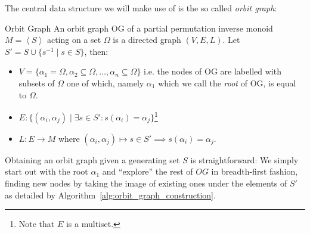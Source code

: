 The central data structure we will make use of is the so called \textit{orbit
graph}:

\begin{defn}{Orbit Graph}
  An orbit graph $\mathrm{OG}$ of a partial permutation inverse monoid $M =
  \left<S\right>$ acting on a set $\Omega$ is a directed graph $(V, E, L)$.
  Let $S' = S \cup \{s^{-1} \mid s \in S\}$, then:
  \begin{itemize}
    \item $V = \{\alpha_1 = \Omega, \alpha_2 \subseteq
      \Omega, \dots, \alpha_n \subseteq \Omega\}$ i.e. the nodes of
      $\mathrm{OG}$ are labelled with subsets of $\Omega$ one of which,
      namely $\alpha_1$ which we call the \textit{root} of
      $\mathrm{OG}$, is equal to $\Omega$.

    \item $E: \{(\alpha_i,\alpha_j) \mid \exists s \in S': s(\alpha_i) =
                \alpha_j\}$\footnote{Note that $E$ is a multiset.}

    \item $L: E \rightarrow M$ where $(\alpha_i,\alpha_j) \mapsto s \in S'
          \implies s(\alpha_i) = \alpha_j$.
  \end{itemize}
\end{defn}
%
Obtaining an orbit graph given a generating set $S$ is straightforward: We
simply start out with the root $\alpha_1$ and ``explore'' the rest of $OG$ in
breadth-first fashion, finding new nodes by taking the image of existing ones
under the elements of $S'$ as detailed by
Algorithm~\ref{alg:orbit_graph_construction}.

